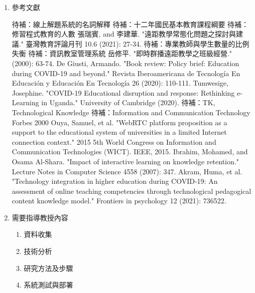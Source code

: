 \documentclass[12pt]{article}
\begin{document}
\begin{enumerate}
  \item 參考文獻
    \renewcommand{\section}[2]{}
    \begin{thebibliography}{99}  
       待補：線上解題系統的名詞解釋
       待補：十二年國民基本教育課程綱要
       待補：修習程式教育的人數
       張瑞賓, and 李建華. "遠距教學常態化問題之探討與建議." 臺灣教育評論月刊 10.6 (2021): 27-34.
       待補：專業教師與學生數量的比例失衡
       待補：資訊教室管理系統
       岳修平. "即時群播遠距教學之班級經營." (2000): 63-74.
       De Giusti, Armando. "Book review: Policy brief: Education during COVID-19 and beyond." Revista Iberoamericana de Tecnología En Educación y Educación En Tecnología 26 (2020): 110-111.
       Tumwesige, Josephine. "COVID-19 Educational disruption and response: Rethinking e-Learning in Uganda." University of Cambridge (2020).
       待補：TK, Technological Knowledge
       待補：Information and Communication Technology
       Forbes 2000
       Ouya, Samuel, et al. "WebRTC platform proposition as a support to the educational system of universities in a limited Internet connection context." 2015 5th World Congress on Information and Communication Technologies (WICT). IEEE, 2015.
       Ibrahim, Mohamed, and Osama Al-Shara. "Impact of interactive learning on knowledge retention." Lecture Notes in Computer Science 4558 (2007): 347.
       Akram, Huma, et al. "Technology integration in higher education during COVID-19: An assessment of online teaching competencies through technological pedagogical content knowledge model." Frontiers in psychology 12 (2021): 736522.
    \end{thebibliography} 

  \item 需要指導教授內容
    \begin{enumerate}
      \setlength{\parindent}{2em}
      \item 資料收集
      \item 技術分析
      \item 研究方法及步驟
      \item 系統測試與部署
    \end{enumerate}
\end{enumerate}
\end{document}
